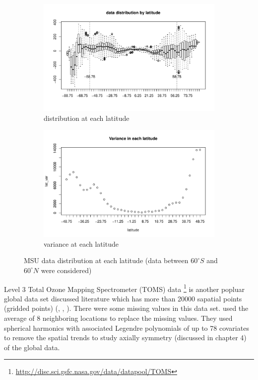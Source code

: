 \begin{figure}[H]
	\begin{subfigure}{.5\textwidth}
		\centering
		\includegraphics[width=1\linewidth]{graphs//MSU_data_latitude}
		\caption{distribution at each latitude}
		\label{MSU_data_latitude}
	\end{subfigure}
	\begin{subfigure}{.5\textwidth}
		\centering
		\includegraphics[width=1\linewidth]{graphs/MSU_data_var_lat}
		\caption{variance at each latitude}
		\label{MSU_data_var_lat}
	\end{subfigure}
	\caption[MSU data distribution at each latitude (data between $60^\circ S$ and $60^\circ N$]{MSU data distribution at each latitude (data between $60^\circ S$ and $60^\circ N$ were considered)}
	\label{compare_varigram_sim_2}
\end{figure}


Level 3 Total Ozone Mapping Spectrometer (TOMS) data \footnote{\url{http://disc.sci.gsfc.nasa.gov/data/datapool/TOMS}} is another popluar global data set discussed literature which has more than 20000 sapatial points (gridded points) (\cite{Stein2007}, \cite{CressieJohannesson2008}, \cite{JunStein2008}). There were some missing values in this data set. \cite{Stein2007} used the average of 8 neighboring locations to replace the missing values. They used spherical harmonics with associated Legendre polynomials of up to 78 covariates to remove the spatial trends to study axially symmetry (discussed in chapter 4) of the global data.

